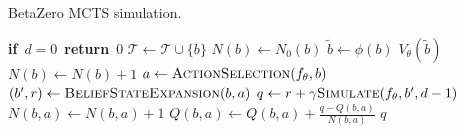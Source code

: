 \begin{algorithm}[H]
    \caption{BetaZero MCTS simulation.}
    \label{alg:betazero-mcts}
    \begin{algorithmic}[1]
            \State \textbf{if}\ $d=0$\ \textbf{return}\ $0$
                \State $\mathcal{T} \leftarrow \mathcal{T} \cup \{b\}$
                \State $N(b) \leftarrow N_0(b)$
                \State $\tilde{b} \leftarrow \phi(b)$ 
                \State \Return $V_\theta(\tilde{b})$  \label{line:mcts_lookup} 
            \EndIf
            \State $N(b) \leftarrow N(b) + 1$
            \State $a \leftarrow \textproc{ActionSelection}(f_\theta, b)$ \label{line:mcts_selection} 
            \State $(b^\prime, r) \leftarrow \textproc{BeliefStateExpansion}(b,a)$\label{line:mcts_expansion} 
            \State $q \leftarrow r + \gamma \textproc{Simulate}(f_\theta, b^\prime, d-1)$ \label{line:mcts_simulation} 
            \State $N(b,a) \leftarrow N(b,a)+1$
            \State $Q(b,a) \leftarrow Q(b,a)+\frac{q-Q(b,a)}{N(b,a)}$  \label{line:mcts_backprop} 
            \State \Return $q$
        \EndFunction
    \end{algorithmic}
\end{algorithm}
